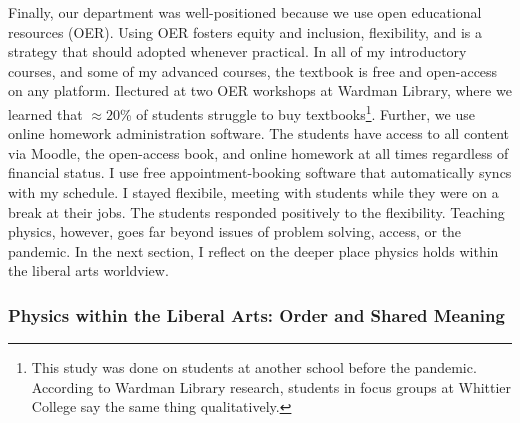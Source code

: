 \documentclass[../../../main.tex]{subfiles}
\begin{document}
Finally, our department was well-positioned because we use open educational resources (OER).  Using OER fosters equity and inclusion, flexibility, and is a strategy that should adopted whenever practical.  In all of my introductory courses, and some of my advanced courses, the textbook is free and open-access on any platform.  Ilectured at two OER workshops at Wardman Library, where we learned that $\approx 20$\% of students struggle to buy textbooks\footnote{This study was done on students at another school before the pandemic.  According to Wardman Library research, students in focus groups at Whittier College say the same thing qualitatively.}.  Further, we use online homework administration software.  The students have access to all content via Moodle, the open-access book, and online homework at all times regardless of financial status.  I use free appointment-booking software that automatically syncs with my schedule.  I stayed flexibile, meeting with students while they were on a break at their jobs.  The students responded positively to the flexibility.  Teaching physics, however, goes far beyond issues of problem solving, access, or the pandemic.  In the next section, I reflect on the deeper place physics holds within the liberal arts worldview.

\subsubsection{Physics within the Liberal Arts: Order and Shared Meaning}
\end{document}
